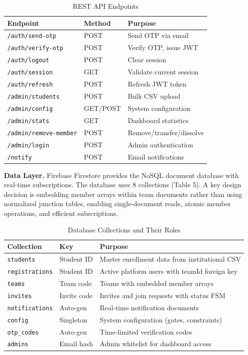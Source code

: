 \documentclass[12pt,a4paper]{article}
\begin{document}
\begin{table}[H]
\centering
\caption{REST API Endpoints}
\begin{tabular}{@{}lll@{}}
\toprule
\textbf{Endpoint} & \textbf{Method} & \textbf{Purpose} \\
\midrule
\texttt{/auth/send-otp} & POST & Send OTP via email \\
\texttt{/auth/verify-otp} & POST & Verify OTP, issue JWT \\
\texttt{/auth/logout} & POST & Clear session \\
\texttt{/auth/session} & GET & Validate current session \\
\texttt{/auth/refresh} & POST & Refresh JWT token \\
\texttt{/admin/students} & POST & Bulk CSV upload \\
\texttt{/admin/config} & GET/POST & System configuration \\
\texttt{/admin/stats} & GET & Dashboard statistics \\
\texttt{/admin/remove-member} & POST & Remove/transfer/dissolve \\
\texttt{/admin/login} & POST & Admin authentication \\
\texttt{/notify} & POST & Email notifications \\
\bottomrule
\end{tabular}
\end{table}

\textbf{Data Layer.} Firebase Firestore provides the NoSQL document database with real-time subscriptions. The database uses 8 collections (Table 5). A key design decision is embedding member arrays within team documents rather than using normalized junction tables, enabling single-document reads, atomic member operations, and efficient subscriptions.

\begin{table}[H]
\centering
\caption{Database Collections and Their Roles}
\begin{tabular}{@{}llp{6cm}@{}}
\toprule
\textbf{Collection} & \textbf{Key} & \textbf{Purpose} \\
\midrule
\texttt{students} & Student ID & Master enrollment data from institutional CSV \\
\texttt{registrations} & Student ID & Active platform users with teamId foreign key \\
\texttt{teams} & Team code & Teams with embedded member arrays \\
\texttt{invites} & Invite code & Invites and join requests with status FSM \\
\texttt{notifications} & Auto-gen & Real-time notification documents \\
\texttt{config} & Singleton & System configuration (gates, constraints) \\
\texttt{otp\_codes} & Auto-gen & Time-limited verification codes \\
\texttt{admins} & Email hash & Admin whitelist for dashboard access \\
\bottomrule
\end{tabular}
\end{table}
\end{document}
